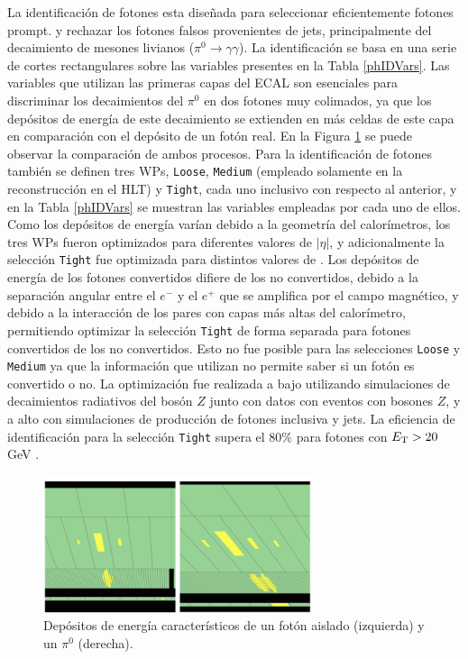 La identificación de fotones esta diseñada para seleccionar eficientemente fotones prompt. y rechazar los fotones falsos provenientes de jets, principalmente del decaimiento de mesones livianos ($\pi^{0}\to\gamma\gamma$). La identificación se basa en una serie de cortes rectangulares sobre las variables presentes en la Tabla \ref{phIDVars}. Las variables que utilizan las primeras capas del ECAL son esenciales para discriminar los decaimientos del $\pi^{0}$ en dos fotones muy colimados, ya que los depósitos de energía de este decaimiento se extienden en más celdas de este capa en comparación con el depósito de un fotón real. En la Figura \ref{phpizero} se puede observar la comparación de ambos procesos. 
Para la identificación de fotones también se definen tres WPs, \texttt{Loose}, \texttt{Medium} (empleado solamente en la reconstrucción en el HLT) y \texttt{Tight}, cada uno inclusivo con respecto al anterior, y en la Tabla \ref{phIDVars} se muestran las variables empleadas por cada uno de ellos. 
Como los depósitos de energía varían debido a la geometría del calorímetros, los tres WPs fueron optimizados para diferentes valores de $|\eta|$, y adicionalmente la selección \texttt{Tight} fue optimizada para distintos valores de \ET. Los depósitos de energía de los fotones convertidos difiere de los no convertidos, debido a la separación angular entre el $e^-$ y el $e^+$ que se amplifica por el campo magnético, y debido a la interacción de los pares con capas más altas del calorímetro, permitiendo optimizar la selección \texttt{Tight} de forma separada para fotones convertidos de los no convertidos. Esto no fue posible para las selecciones \texttt{Loose} y \texttt{Medium} ya que la información que utilizan no permite saber si un fotón es convertido o no. La optimización fue realizada a bajo \ET utilizando simulaciones de decaimientos radiativos del bosón $Z$ junto con datos con eventos con bosones $Z$, y a alto \ET con simulaciones de producción de fotones inclusiva y jets. La eficiencia de identificación para la selección \texttt{Tight} supera el 80\% para fotones con $E_{\text{T}}>20$ GeV \cite{EGAM-2018-01}.

\begin{figure}
  \centering
  \includegraphics[width=0.7\textwidth]{images/PhotonPizero.png}
  \caption{Depósitos de energía característicos de un fotón aislado (izquierda) y un $\pi^0$ (derecha).
  }
  \label{phpizero}
\end{figure}


